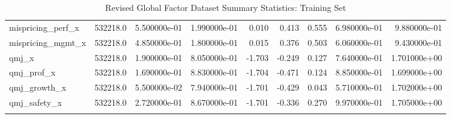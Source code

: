 \documentclass[12pt]{article}
\begin{document}
\begin{landscape}
\begin{longtable}{|l|r|r|r|r|r|r|r|r|}
mispricing\_perf\_x      &  532218.0 &  5.500000e-01 &  1.990000e-01 &       0.010 &        0.413 &        0.555 &  6.980000e-01 &  9.880000e-01 \\
mispricing\_mgmt\_x      &  532218.0 &  4.850000e-01 &  1.800000e-01 &       0.015 &        0.376 &        0.503 &  6.060000e-01 &  9.430000e-01 \\
qmj\_x                  &  532218.0 &  1.900000e-01 &  8.050000e-01 &      -1.703 &       -0.249 &        0.127 &  7.640000e-01 &  1.701000e+00 \\
qmj\_prof\_x             &  532218.0 &  1.690000e-01 &  8.830000e-01 &      -1.704 &       -0.471 &        0.124 &  8.850000e-01 &  1.699000e+00 \\
qmj\_growth\_x           &  532218.0 &  5.500000e-02 &  7.940000e-01 &      -1.701 &       -0.429 &        0.043 &  5.710000e-01 &  1.702000e+00 \\
qmj\_safety\_x           &  532218.0 &  2.720000e-01 &  8.670000e-01 &      -1.701 &       -0.336 &        0.270 &  9.970000e-01 &  1.705000e+00 \\
\bottomrule
\caption{Revised Global Factor Dataset Summary Statistics: Training Set}
\label{table:ss-train}
\end{longtable}

\newpage


\end{landscape}
\end{document}
